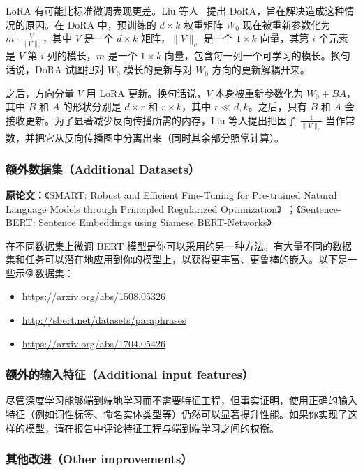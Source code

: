 \documentclass[11pt]{article}
\begin{document}
LoRA 有可能比标准微调表现更差。Liu 等人~\cite{liu2024dora} 提出 DoRA，旨在解决造成这种情况的原因。在 DoRA 中，预训练的 $d \times k$ 权重矩阵 $W_0$ 现在被重新参数化为 $m \cdot \frac{V}{\lVert V \rVert_c}$，其中 $V$ 是一个 $d \times k$ 矩阵，$\lVert V \rVert_c$ 是一个 $1 \times k$ 向量，其第 $i$ 个元素是 $V$ 第 $i$ 列的模长，$m$ 是一个 $1 \times k$ 向量，包含每一列一个可学习的模长。换句话说，DoRA 试图把对 $W_0$ 模长的更新与对 $W_0$ 方向的更新解耦开来。

之后，方向分量 $V$ 用 LoRA 更新。换句话说，$V$ 本身被重新参数化为 $W_0 + BA$，其中 $B$ 和 $A$ 的形状分别是 $d \times r$ 和 $r \times k$，其中 $r \ll d, k$。之后，只有 $B$ 和 $A$ 会接收更新。为了显著减少反向传播所需的内存，Liu 等人提出把因子 $\frac{1}{\lVert V \rVert_c}$ 当作常数，并把它从反向传播图中分离出来（同时其余部分照常计算）。

\subsubsection{额外数据集（Additional Datasets）}

\textbf{原论文：}《SMART: Robust and Efficient Fine-Tuning for Pre-trained Natural Language Models through Principled Regularized Optimization》~\cite{jiang2019smart}；《Sentence-BERT: Sentence Embeddings using Siamese BERT-Networks》~\cite{reimers2019sentence}

在不同数据集上微调 BERT 模型是你可以采用的另一种方法。有大量不同的数据集和任务可以潜在地应用到你的模型上，以获得更丰富、更鲁棒的嵌入。以下是一些示例数据集：

\begin{itemize}[leftmargin=1.5em]
  \item \url{https://arxiv.org/abs/1508.05326}
  \item \url{http://sbert.net/datasets/paraphrases}
  \item \url{https://arxiv.org/abs/1704.05426}
\end{itemize}

\subsubsection{额外的输入特征（Additional input features）}

尽管深度学习能够端到端地学习而不需要特征工程，但事实证明，使用正确的输入特征（例如词性标签、命名实体类型等）仍然可以显著提升性能。如果你实现了这样的模型，请在报告中评论特征工程与端到端学习之间的权衡。

\subsubsection{其他改进（Other improvements）}
\end{document}

